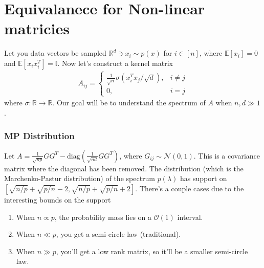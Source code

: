 \section{Equivalanece for Non-linear matricies}
Let you data vectors be sampled $\mathbb R^d \ni x_i \sim p(x)$ for $i \in [n]$, where $\mathbb E[x_i] = 0$ and $\mathbb E[x_i x_i^T] = \mathbb I$. Now let's construct a kernel matrix
\begin{align}
	A_{ij} = \begin{cases}
		\frac{1}{\sqrt n} \sigma(x_i^T  x_j/\sqrt{d}), & i \neq j\\
		0, & i= j
	\end{cases}
\end{align}
where $\sigma: \mathbb R \to \mathbb R$.
Our goal will be to understand the spectrum of $A$ when $n,d \gg 1$.
\subsubsection{MP Distribution}
Let $A = \frac{1}{\sqrt{n p}} G G^T - \text{diag}(\frac{1}{\sqrt{n d}} G G^T)$, where $G_{ij} \sim \mathcal N(0,1)$. This is a covariance matrix where the diagonal has been removed. The distribution (which is the Marchenko-Pastur distribution) of the spectrum $p(\lambda)$ has support on $[\sqrt{n/p} +\sqrt{p/n} -2, \sqrt{n / p} + \sqrt{p/n} + 2]$. There's a couple cases due to the interesting bounds on the support
\begin{enumerate}
	\item When $n \propto p$, the probability mass lies on a $\mathcal O(1)$ interval.
	\item When $n \ll p$, you get a semi-circle law (traditional).
	\item When $n \gg p$, you'll get a low rank matrix, so it'll be a smaller semi-circle law. 
\end{enumerate}
